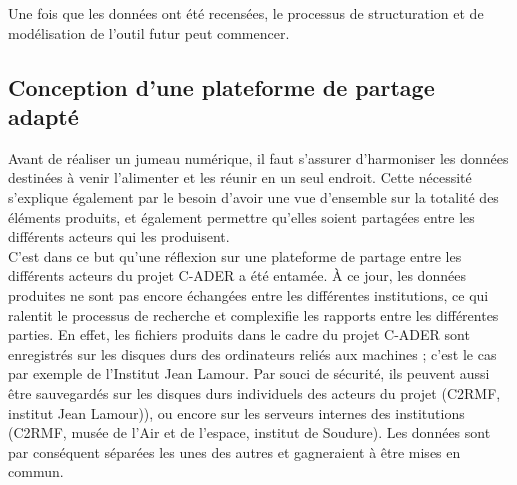 
Une fois que les données ont été recensées, le processus de structuration et de modélisation de l'outil futur peut commencer.


        \subsection{Conception d’une plateforme de partage adapté}

Avant de réaliser un jumeau numérique, il faut s'assurer d'harmoniser les données destinées à venir l'alimenter et les réunir en un seul endroit. Cette nécessité s'explique également par le besoin d'avoir une vue d'ensemble sur la totalité des éléments produits, et également permettre qu’elles soient partagées entre les différents acteurs qui les produisent.\\

C’est dans ce but qu’une réflexion sur une plateforme de partage entre les différents acteurs du projet C-ADER a été entamée. À ce jour, les données produites ne sont pas encore échangées entre les différentes institutions, ce qui ralentit le processus de recherche et complexifie les rapports entre les différentes parties. En effet, les fichiers produits dans le cadre du projet C-ADER sont enregistrés sur les disques durs des ordinateurs reliés aux machines ; c’est le cas par exemple de l’Institut Jean Lamour. Par souci de sécurité, ils peuvent aussi être sauvegardés sur les disques durs individuels des acteurs du projet (C2RMF, institut Jean Lamour)), ou encore sur les serveurs internes des institutions (C2RMF, musée de l’Air et de l’espace, institut de Soudure). Les données sont par conséquent séparées les unes des autres et gagneraient à être mises en commun.\\

